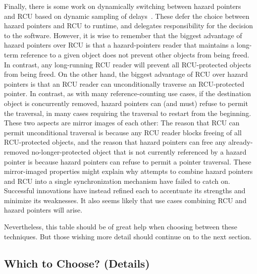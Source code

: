Finally, there is some work on dynamically switching between hazard
pointers and RCU based on dynamic sampling of
delays~\cite{Balmau:2016:FRM:2935764.2935790,JeehoonKang2020MarryHazptrRCU}.
These defer the choice between hazard pointers and RCU to runtime,
and delegates responsibility for the decision to the software.
However, it is wise to remember that the
biggest advantage of hazard pointers over RCU is that a
hazard-pointers reader that maintains a long-term reference to a given
object does not prevent other objects from being freed.
In contrast, any long-running RCU reader will prevent all RCU-protected
objects from being freed.
On the other hand, the biggest advantage of RCU over hazard pointers is
that an RCU reader can unconditionally traverse an RCU-protected pointer.
In contrast, as with many reference-counting use cases, if the destination
object is concurrently removed, hazard pointers can (and must) refuse to
permit the traversal, in many cases requiring the traversal to restart
from the beginning.
These two aspects are mirror images of each other:
The reason that RCU can permit unconditional traversal is because any
RCU reader blocks freeing of all RCU-protected objects, and the reason
that hazard pointers can free any already-removed no-longer-protected
object that is not currently referenced by a hazard pointer is because
hazard pointers can refuse to permit a pointer traversal.
These mirror-imaged properties might explain why attempts to combine
hazard pointers and RCU into a single synchronization mechanism have
failed to catch on.
Successful innovations have instead refined each to accentuate its
strengths and minimize its weaknesses.
It also seems likely that use cases combining RCU and hazard pointers
will arise.

Nevertheless, this table should be of great help when choosing between
these techniques.
But those wishing more detail should continue on to the next section.

\subsection{Which to Choose?
			     (Details)}
\label{sec:defer:Which to Choose? (Details)}

